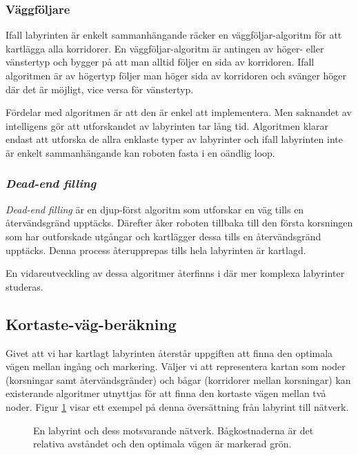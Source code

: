 \documentclass[11pt]{article}
\begin{document}
\begin{flushleft}
\subsubsection{Väggföljare}
Ifall labyrinten är enkelt sammanhängande räcker en väggföljar-algoritm för att kartlägga alla korridorer. En väggföljar-algoritm är antingen av höger- eller vänstertyp och bygger på att man alltid följer en sida av korridoren. Ifall algoritmen är av högertyp följer man höger sida av korridoren och svänger höger där det är möjligt, vice versa för vänstertyp.

Fördelar med algoritmen är att den är enkel att implementera. Men saknandet av intelligens gör att utforskandet av labyrinten tar lång tid. Algoritmen klarar endast att utforska de allra enklaste typer av labyrinter och ifall labyrinten inte är enkelt sammanhängande kan roboten fasta i en oändlig loop.

\subsubsection{\emph{Dead-end filling}}
\emph{Dead-end filling} är en djup-först algoritm som utforskar en väg tills en återvändsgränd upptäcks. Därefter åker roboten tillbaka till den första korsningen som har outforskade utgångar och kartlägger dessa tills en återvändsgränd upptäcks. Denna process återupprepas tills hela labyrinten är kartlagd.

En vidareutveckling av dessa algoritmer återfinns i \cite{flood} där mer komplexa labyrinter studeras.

\subsection{Kortaste-väg-beräkning}
\label{optimalvag}
Givet att vi har kartlagt labyrinten återstår uppgiften att finna den optimala vägen mellan ingång och markering. Väljer vi att representera kartan som noder (korsningar samt återvändsgränder) och bågar (korridorer mellan korsningar) kan existerande algoritmer utnyttjas för att finna den kortaste vägen mellan två noder. Figur \ref{labToGraph} visar ett exempel på denna översättning från labyrint till nätverk. 

\begin{figure}[htbp]
\centering
\noindent\resizebox{.6\linewidth}{!}{
	}
	\caption{En labyrint och dess motsvarande nätverk. Bågkostnaderna är det relativa avståndet och den optimala vägen är markerad grön.\label{labToGraph}}	
\end{figure}


\end{flushleft}
\end{document}
